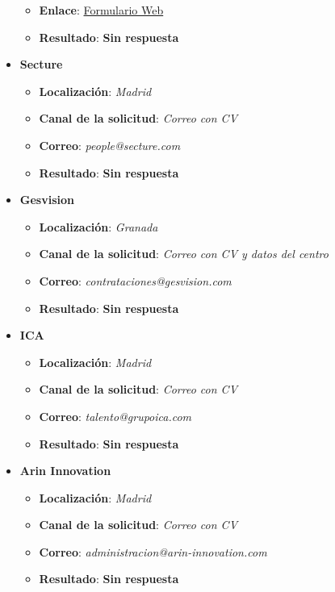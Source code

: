 \begin{itemize}
\begin{itemize}
		\item \textbf{Enlace}: \href{https://be.knowmadmood.com/}{Formulario Web}
		\item \textbf{Resultado}: {\color{orange} \textbf{Sin respuesta}}
	\end{itemize}
	\item \textbf{Secture}
	\begin{itemize}
		\item \textbf{Localización}: \textit{Madrid}
		\item \textbf{Canal de la solicitud}: \textit{Correo con CV}
		\item \textbf{Correo}: \textit{people@secture.com}
		\item \textbf{Resultado}: {\color{orange} \textbf{Sin respuesta}}
	\end{itemize}
 	\item \textbf{Gesvision}
	\begin{itemize}
		\item \textbf{Localización}: \textit{Granada}
		\item \textbf{Canal de la solicitud}: \textit{Correo con CV y datos del centro}
		\item \textbf{Correo}: \textit{contrataciones@gesvision.com}
		\item \textbf{Resultado}: {\color{orange} \textbf{Sin respuesta}}
	\end{itemize}
	\item \textbf{ICA}
	\begin{itemize}
		\item \textbf{Localización}: \textit{Madrid}
		\item \textbf{Canal de la solicitud}: \textit{Correo con CV}
		\item \textbf{Correo}: \textit{talento@grupoica.com}
		\item \textbf{Resultado}: {\color{orange} \textbf{Sin respuesta}}
	\end{itemize}
	\item \textbf{Arin Innovation}
	\begin{itemize}
		\item \textbf{Localización}: \textit{Madrid}
		\item \textbf{Canal de la solicitud}: \textit{Correo con CV}
		\item \textbf{Correo}: \textit{administracion@arin-innovation.com}
		\item \textbf{Resultado}: {\color{orange} \textbf{Sin respuesta}}
	\end{itemize}

\end{itemize}
